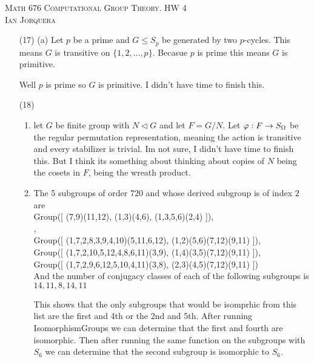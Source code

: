 \documentclass[12pt]{amsart}
\begin{document}
\begin{center}
   \textsc{Math 676 Computational Group Theory. HW 4\\ Ian Jorquera}
\end{center}
\vspace{1em}

\begin{itemize}
   \item[(17)] (a) Let $p$ be a prime and $G\leq S_p$ be generated by two $p$-cycles.
   This means $G$ is transitive on $\{1,2,\dots,p\}$. Becasue $p$ is prime this means 
   $G$ is primitive.

   Well $p$ is prime so $G$ is primitive. I didn't have time to finish this.

   
   \item[(18)] 
   \begin{enumerate}[label= (\alph*)]
      \item let $G$ be finite group with $N\triangleleft G$ and let $F=G/N$.
      Let $\varphi:F\rightarrow S_\Omega$ be the regular permutation representation, meaning the action is transitive and every stabilizer is trivial.
      Im not sure, I didn't have time to finish this. But I think its something about thinking about copies of $N$ being the cosets in $F$, being the wreath product.



      \item The 5 subgroups of order $720$ and whose derived subgroup is of index $2$ are\\
      Group([ (7,9)(11,12), (1,3)(4,6), (1,3,5,6)(2,4) ]),\\
      ,\\
      Group([ (1,7,2,8,3,9,4,10)(5,11,6,12), (1,2)(5,6)(7,12)(9,11) ]),\\
      Group([ (1,7,2,10,5,12,4,8,6,11)(3,9), (1,4)(3,5)(7,12)(9,11) ]),\\
      Group([ (1,7,2,9,6,12,5,10,4,11)(3,8), (2,3)(4,5)(7,12)(9,11) ])\\

      And the number of conjugacy classes of each of the 
      following subgroups is $14, 11, 8, 14, 11$

      This shows that the only subgroups that would be isomprhic from this list are the first and 4th or the 2nd and 5th.
      After running IsomorphismGroups we can determine that the first and fourth are isomorphic.
      Then after running the same function on the subgroups with $S_6$ we can determine that the second subgroup is isomorphic to $S_6$.



\end{enumerate}
\end{itemize}
\end{document}
